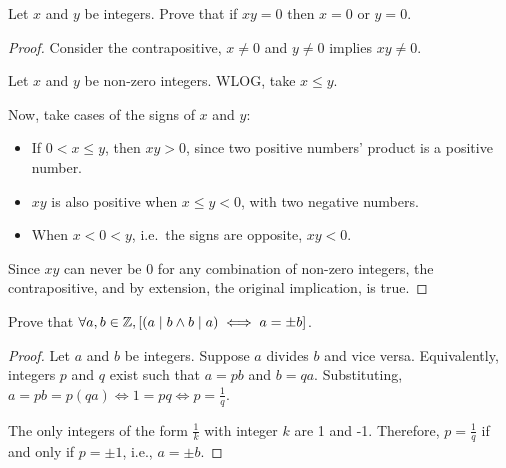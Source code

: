 \question Let $x$ and $y$ be integers. Prove that if $xy = 0$ then $x = 0$ or $y = 0$.
\begin{proof}
  Consider the contrapositive, $x \neq 0$ and $y \neq 0$ implies $xy \neq 0$.

  Let $x$ and $y$ be non-zero integers.
  WLOG, take $x \leq y$.

  Now, take cases of the signs of $x$ and $y$:
  \begin{itemize}
    \item If $0 < x \leq y$, then $xy > 0$, since two positive numbers' product is a positive number.
    \item $xy$ is also positive when $x \leq y < 0$, with two negative numbers.
    \item When $x < 0 < y$, i.e.\ the signs are opposite, $xy < 0$.
  \end{itemize}

  Since $xy$ can never be 0 for any combination of non-zero integers, the contrapositive, and by extension, the original implication, is true.
\end{proof}


\question Prove that $\forall a,b\in\mathbb{Z},[(a \mid b \land b \mid a) \iff a = \pm b]$.
\begin{proof}
  Let $a$ and $b$ be integers.
  Suppose $a$ divides $b$ and vice versa.
  Equivalently, integers $p$ and $q$ exist such that $a = pb$ and $b = qa$.
  Substituting, $a = pb = p(qa) \iff 1 = pq \iff p = \frac{1}{q}$.

  The only integers of the form $\frac{1}{k}$ with integer $k$ are 1 and -1.
  Therefore, $p = \frac{1}{q}$ if and only if $p = \pm1$, i.e., $a = \pm b$.
\end{proof}


